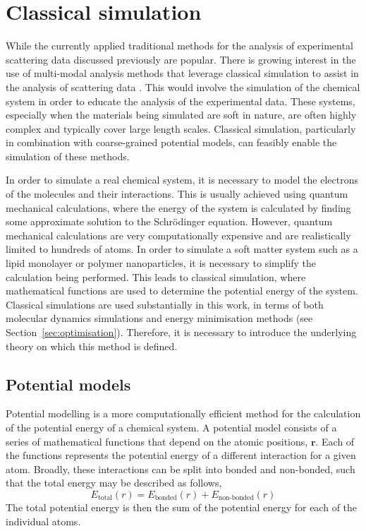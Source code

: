 \section{Classical simulation}
\label{sec:classical}

While the currently applied traditional methods for the analysis of experimental scattering data discussed previously are popular.
There is growing interest in the use of multi-modal analysis methods that leverage classical simulation to assist in the analysis of scattering data \cite{ivanovic_temperature-dependent_2018,scoppola_combining_2018,dabkowska_modulation_2014,hub_interpreting_2018}.
This would involve the simulation of the chemical system in order to educate the analysis of the experimental data.
These systems, especially when the materials being simulated are soft in nature, are often highly complex and typically cover large length scales.
Classical simulation, particularly in combination with coarse-grained potential models, can feasibly enable the simulation of these methods.

In order to simulate a real chemical system, it is necessary to model the electrons of the molecules and their interactions.
This is usually achieved using quantum mechanical calculations, where the energy of the system is calculated by finding some approximate solution to the Schr\"{o}dinger equation.
However, quantum mechanical calculations are very computationally expensive and are realistically limited to hundreds of atoms.
In order to simulate a soft matter system such as a lipid monolayer or polymer nanoparticles, it is necessary to simplify the calculation being performed.
This leads to classical simulation, where mathematical functions are used to determine the potential energy of the system.
Classical simulations are used substantially in this work, in terms of both molecular dynamics simulations and energy minimisation methods (see Section~\ref{sec:optimisation}).
Therefore, it is necessary to introduce the underlying theory on which this method is defined.

\subsection{Potential models}
\label{sec:potentmodels}
Potential modelling is a more computationally efficient method for the calculation of the potential energy of a chemical system.
A potential model consists of a series of mathematical functions that depend on the atomic positions, $\mathbf{r}$.
Each of the functions represents the potential energy of a different interaction for a given atom.
Broadly, these interactions can be split into bonded and non-bonded, such that the total energy may be described as follows,
%
\begin{equation}
  E_{\text{total}}(r) = E_{\text{bonded}}(r) + E_{\text{non-bonded}}(r)
\end{equation}
%
The total potential energy is then the sum of the potential energy for each of the individual atoms.

